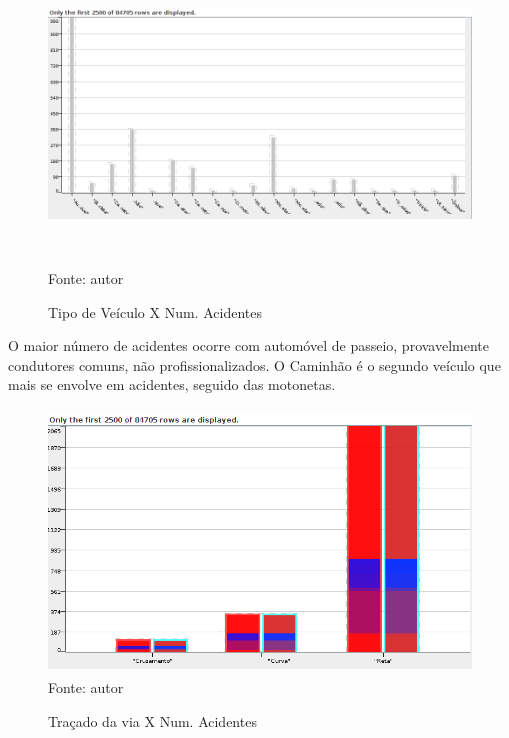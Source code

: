 \pagebreak

\begin{figure}[ht]
\begin{center}
\caption{Tipo de Veículo X Num. Acidentes}
\includegraphics[width=150mm, height=80mm]{Figuras/Preprocess/TipoVeiculoXNumAciden.png}\\
\tiny Fonte: autor
\end{center}
\end{figure}

O maior número de acidentes ocorre com automóvel de passeio, provavelmente condutores comuns, não profissionalizados.
O Caminhão é o segundo veículo que mais se envolve em acidentes, seguido das motonetas. 

\begin{figure}[ht]
\begin{center}
\caption{Traçado da via X Num. Acidentes}
\includegraphics[width=120mm, height=70mm]{Figuras/Preprocess/TracadoViaNumAcident.png}\\
\tiny Fonte: autor
\end{center}
\end{figure}

